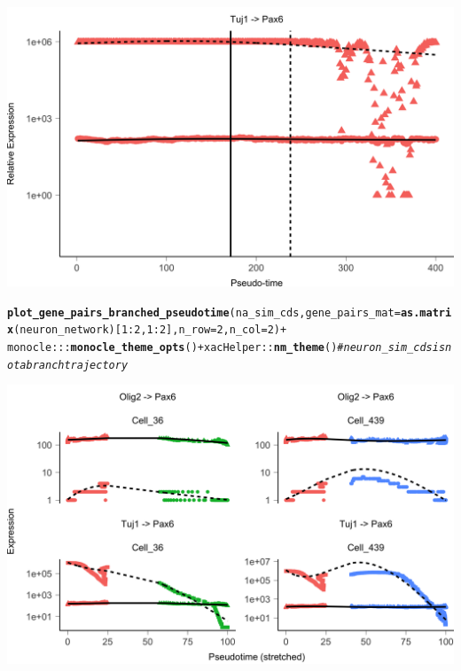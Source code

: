\documentclass[10pt,oneside]{article}\usepackage[]{graphicx}\usepackage[]{color}
\makeatletter
\def\maxwidth{ %
  \ifdim\Gin@nat@width>\linewidth
    \linewidth
  \else
    \Gin@nat@width
  \fi
}
\newcommand{\hlnum}[1]{\textcolor[rgb]{0.686,0.059,0.569}{#1}}%
\newcommand{\hlcom}[1]{\textcolor[rgb]{0.678,0.584,0.686}{\textit{#1}}}%
\newcommand{\hlopt}[1]{\textcolor[rgb]{0,0,0}{#1}}%
\newcommand{\hlstd}[1]{\textcolor[rgb]{0.345,0.345,0.345}{#1}}%
\newcommand{\hlkwc}[1]{\textcolor[rgb]{0.333,0.667,0.333}{#1}}%
\newcommand{\hlkwd}[1]{\textcolor[rgb]{0.737,0.353,0.396}{\textbf{#1}}}%
\newenvironment{kframe}{%
 \def\at@end@of@kframe{}%
 \ifinner\ifhmode%
  \def\at@end@of@kframe{\end{minipage}}%
  \begin{minipage}{\columnwidth}%
 \fi\fi%
 \def\FrameCommand##1{\hskip\@totalleftmargin \hskip-\fboxsep
 \colorbox{shadecolor}{##1}\hskip-\fboxsep
     \hskip-\linewidth \hskip-\@totalleftmargin \hskip\columnwidth}%
 \MakeFramed {\advance\hsize-\width
   \@totalleftmargin\z@ \linewidth\hsize
   \@setminipage}}%
 {\par\unskip\endMakeFramed%
 \at@end@of@kframe}
\newenvironment{knitrout}{}{} %
\makeatother
\begin{document}
\begin{knitrout}
{\centering \includegraphics[width=\maxwidth]{figure/gene_pairwise_kinetic_plot-1} 

}


\begin{kframe}\begin{alltt}
\hlkwd{plot_gene_pairs_branched_pseudotime}\hlstd{(na_sim_cds,} \hlkwc{gene_pairs_mat} \hlstd{=} \hlkwd{as.matrix}\hlstd{(neuron_network)[}\hlnum{1}\hlopt{:}\hlnum{2}\hlstd{,} \hlnum{1}\hlopt{:}\hlnum{2}\hlstd{],} \hlkwc{n_row} \hlstd{=} \hlnum{2}\hlstd{,} \hlkwc{n_col} \hlstd{=} \hlnum{2}\hlstd{)} \hlopt{+}
  \hlstd{monocle}\hlopt{:::}\hlkwd{monocle_theme_opts}\hlstd{()} \hlopt{+} \hlstd{xacHelper}\hlopt{::}\hlkwd{nm_theme}\hlstd{()} \hlcom{# neuron_sim_cds is not a branch trajectory }
\end{alltt}
\end{kframe}

{\centering \includegraphics[width=\maxwidth]{figure/gene_pairwise_kinetic_plot-2} 

}



\end{knitrout}
\end{document}
